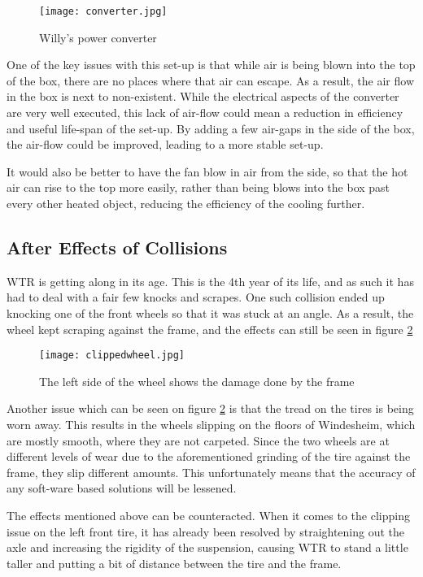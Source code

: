 \begin{figure}[H]
\centering
\texttt{[image: converter.jpg]}
\caption{Willy's power converter}
\label{fig::converter}
\end{figure}

One of the key issues with this set-up is that while air is being blown into the top of the box, there are no places where that air can escape.
As a result, the air flow in the box is next to non-existent.
While the electrical aspects of the converter are very well executed, this lack of air-flow could mean a reduction in efficiency and useful life-span of the set-up.
By adding a few air-gaps in the side of the box, the air-flow could be improved, leading to a more stable set-up.

It would also be better to have the fan blow in air from the side, so that the hot air can rise to the top more easily, rather than being blows into the box past every other heated object, reducing the efficiency of the cooling further.


\subsection{After Effects of Collisions}
WTR is getting along in its age.
This is the 4th year of its life, and as such it has had to deal with a fair few knocks and scrapes.
One such collision ended up knocking one of the front wheels so that it was stuck at an angle.
As a result, the wheel kept scraping against the frame, and the effects can still be seen in figure \ref{fig::wheelclip}

\begin{figure}[H]
\centering
\texttt{[image: clippedwheel.jpg]}
\caption{The left side of the wheel shows the damage done by the frame}
\label{fig::wheelclip}
\end{figure}

Another issue which can be seen on figure \ref{fig::wheelclip} is that the tread on the tires is being worn away.
This results in the wheels slipping on the floors of Windesheim, which are mostly smooth, where they are not carpeted.
Since the two wheels are at different levels of wear due to the aforementioned grinding of the tire against the frame, they slip different amounts.
This unfortunately means that the accuracy of any soft-ware based solutions will be lessened.

The effects mentioned above can be counteracted.
When it comes to the clipping issue on the left front tire, it has already been resolved by straightening out the axle and increasing the rigidity of the suspension, causing WTR to stand a little taller and putting a bit of distance between the tire and the frame.

